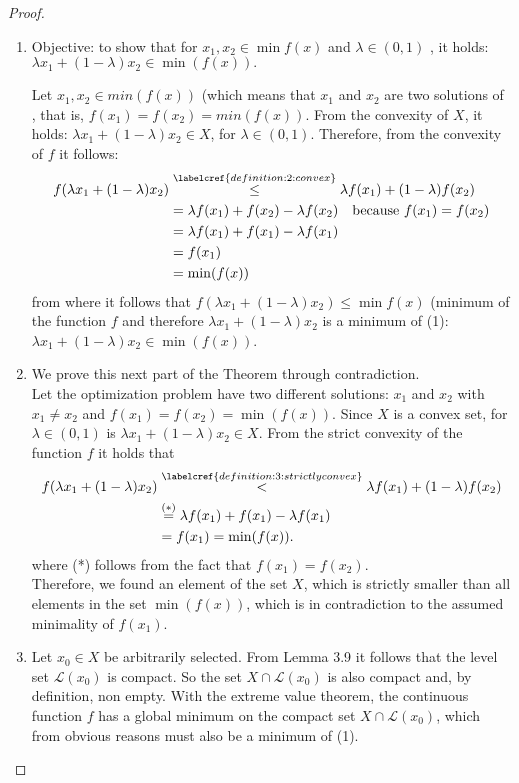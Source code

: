 \documentclass[a4paper, 11pt]{report}
\theoremstyle{break}
\theoremstyle{proofstyle}
\newtheorem{proof}{Proof}
\begin{document}
\begin{proof}
	\begin{enumerate}[label=(\arabic*)]
	    \item Objective: to show that for $x_1, x_2 \in \min f(x)$ and $\lambda \in (0,1)$ , it holds: $\lambda x_1+(1-\lambda)x_2 \in \min(f(x)).$ 
	    
	    Let $x_1, x_2 \in min(f(x))$  (which means that $x_1$ and $x_2$ are two solutions of , that is, $f(x_1)=f(x_2)=min(f(x))$. From the convexity of $X$, it holds: $\lambda x_1 +(1-\lambda) x_2 \in X$, for $\lambda\in (0,1)$. Therefore, from the convexity of $f$ it follows: 
		\begin{align*}
		    f(\lambda x_1+(1-\lambda)x_2) &\overset{\labelcref{definition:2:convex}}{\leq}\lambda f(x_1)+(1-\lambda)f(x_2)\\
		    &= \lambda f(x_1)+f(x_2)-\lambda f(x_2)  \quad \text{because } f(x_1)=f(x_2)\\
		    &= \lambda f(x_1)+f(x_1)-\lambda f(x_1)\\
		    &= f(x_1)\\
		    &= \min(f(x))
		\end{align*}
	   from where it follows that $f(\lambda{x_1}+(1-\lambda)x_2)\leq \min f(x)$ (minimum of the function $f$ and therefore $\lambda x_1 + (1-\lambda)x_2$ is a minimum of (1): $\lambda x_1 + (1-\lambda)x_2\in \min(f(x))$.
	
		\item We prove this next part of the Theorem through contradiction. \\ 
		Let the optimization problem  have two different solutions: $x_1$ and $x_2$ with $x_1 \neq x_2$ and $f(x_1)=f(x_2)=\min(f(x))$. Since $X$ is a convex set, for $\lambda\in (0,1)$ is $\lambda x_1 + (1-\lambda) x_2 \in X$. From the strict convexity of the function $f$ it holds that 
		\begin{align*}
		    f( \lambda x_1 + (1-\lambda) x_2 ) &\overset{\labelcref{definition:3:strictlyconvex}}{<} \lambda f(x_1) + (1-\lambda) f(x_2)\\
		    &\overset{(*)}{=}\lambda f(x_1) + f(x_1) - \lambda f(x_1)\\
		    &= f(x_1) = \min(f(x)).
		\end{align*}
		where (*) follows from the fact that $f(x_1)=f(x_2)$. \\
		Therefore, we found an element of the set $X$, which is strictly smaller than all elements in the set $\min(f(x))$, which is in contradiction to the assumed minimality of $f(x_1)$.
		\item Let $x_0\in X$ be arbitrarily selected. From Lemma 3.9 it follows that the level set $\mathcal{L}(x_0)$ is compact. So the set $X \cap \mathcal{L}(x_0)$ is also compact and, by definition, non empty. With the extreme value theorem, the continuous function $f$ has a global minimum on the compact set $X \cap \mathcal{L}(x_0)$, which from obvious reasons must also be a minimum of (1). 
		

\end{enumerate}
\end{proof}
\end{document}
